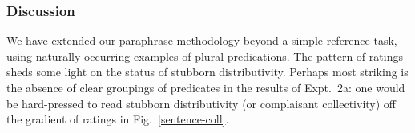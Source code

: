 \documentclass[preprint,12pt,authoryear,titlepage]{elsarticle}
\newcommand{\ndg}[1]{\textcolor{Green}{[ndg: #1]}}
\begin{document}
\subsubsection{Discussion}

We have extended our paraphrase methodology beyond a simple reference task, using naturally-occurring examples of plural predications.
The pattern of ratings sheds some light on the status of stubborn distributivity. Perhaps most striking is the absence of clear groupings of predicates in the results of Expt.~2a: one would be hard-pressed to read stubborn distributivity (or complaisant collectivity) off the gradient of ratings in Fig.~\ref{sentence-coll}.


\end{document}
